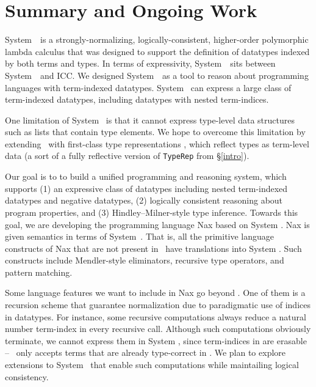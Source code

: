 \section{Summary and Ongoing Work} \label{sec:concl}
System~\Fi\ is a strongly-normalizing, logically-consistent, higher-order
polymorphic lambda calculus that was designed to support the
definition of datatypes indexed by both terms and types.
In terms of expressivity, System~\Fi\ sits between System~\Fw\ and ICC.
We designed System~\Fi\ as a tool to reason about programming
languages with term-indexed datatypes. System \Fi\ can express
a large class of term-indexed datatypes, including datatypes
with nested term-indices.

One limitation of System \Fi\ is that it cannot express type-level
data structures such as lists that contain type elements.
We hope to overcome this limitation by extending \Fi\ 
with first-class type representations \cite{DagMcb12}, which reflect
types as term-level data (a sort of a fully reflective version of
{\small\tt TypeRep} from \S\ref{intro}).

Our goal is to to build a unified programming and reasoning system,
which supports
(1) an expressive class of datatypes including nested term-indexed datatypes
and negative datatypes,
(2) logically consistent reasoning about program properties, and
(3) Hindley--Milner-style type inference.
Towards this goal, we are developing the programming language
Nax \cite{AhnSheFioPit12} based on System \Fi.
Nax is given semantics in terms of System~\Fi.
That is, all the primitive language constructs of Nax that are not present
in \Fi\ have translations into System \Fi. Such constructs include
Mendler-style eliminators, recursive type operators, and
pattern matching.

Some language features we want to include in Nax go beyond \Fi.
One of them is a recursion scheme that guarantee normalization
due to paradigmatic use of indices in datatypes. For instance,
some recursive computations always reduce a natural number term-index
in every recursive call. Although such computations obviously terminate,
we cannot express them in System \Fi, since term-indices in are erasable
-- \Fi\ only accepts terms that are already type-correct in \Fw.
We plan to explore extensions to System \Fi\ that enable such computations
while maintailing logical consistency.

